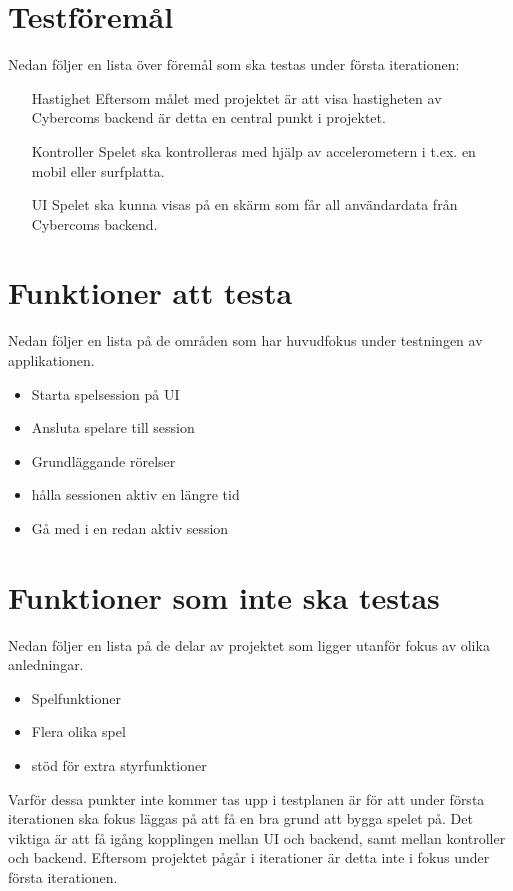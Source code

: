 \documentclass[10pt]{article}
\begin{document}
	
\section{Testföremål}
	Nedan följer en lista över föremål som ska testas under första iterationen:
	\begin{itemize}
	\item [Hastighet] Eftersom målet med projektet är att visa hastigheten av Cybercoms backend är detta en central punkt i projektet.
	\item [Kontroller] Spelet ska kontrolleras med hjälp av accelerometern i t.ex. en mobil eller surfplatta.
	\item [UI] Spelet ska kunna visas på en skärm som får all användardata från Cybercoms backend.
	\end{itemize}
	
	
	
	

\section{Funktioner att testa}
	Nedan följer en lista på de områden som har huvudfokus under testningen av applikationen.
	\begin{itemize}
	\item Starta spelsession på UI 
	\item Ansluta spelare till session
	\item Grundläggande rörelser
	\item hålla sessionen aktiv en längre tid
	\item Gå med i en redan aktiv session
	\end{itemize}
	
	
	
\section{Funktioner som inte ska testas}
	Nedan följer en lista på de delar av projektet som ligger utanför fokus av olika anledningar.
	\begin{itemize}
	\item Spelfunktioner
	\item Flera olika spel
	\item stöd för extra styrfunktioner
	\end{itemize}
	Varför dessa punkter inte kommer tas upp i testplanen är för att under första iterationen ska fokus läggas på att få en bra grund att bygga spelet på. Det viktiga är att få igång kopplingen mellan UI och backend, samt mellan kontroller och backend. Eftersom projektet pågår i iterationer är detta inte i fokus under första iterationen.
\end{document}
